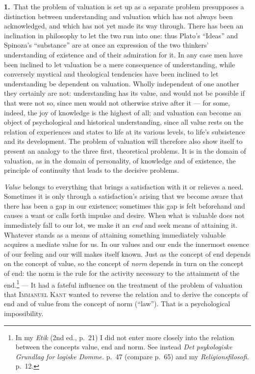 \documentclass[12pt,a4paper]{book}
\newcommand{\opage}[1]{\marginnote{\footnotesize\textit{[#1]}}}
\begin{document}
\noindent\textbf{\opage{70}1.}~That the problem of valuation is set up as a separate
problem presupposes a distinction between understanding and valuation which has
not always been acknowledged, and which has not yet made its way through. There
has been an inclination in philosophy to let the two run into one: thus Plato's
``Ideas'' and Spinoza's ``substance'' are at once an expression of the two
thinkers' understanding of existence and of their admiration for it. In any case
men have been inclined to let valuation be a mere consequence of understanding,
while conversely mystical and theological tendencies have been inclined to let
understanding be dependent on valuation. Wholly independent of one another they
certainly are not: understanding has its value, and would not be possible if that
were not so, since men would not otherwise strive after it --- for some, indeed,
the joy of knowledge is the highest of all; and valuation can become an object of
psychological and historical understanding, since all value rests on the relation
of experiences and states to life at its various levels, to life's subsistence
and its development. The problem of valuation will therefore also show itself to
present an analogy to the three first, theoretical problems. It is in the domain
of valuation, as in the domain of personality, of knowledge and of existence, the
principle of continuity that leads to the decisive problems.

\emph{Value} belongs to everything that brings a satisfaction with it or
relieves a need. Sometimes it is only through a \opage{71}satisfaction's arising that we
become aware that there has been a gap in our existence; sometimes this gap is
felt beforehand and causes a want or calls forth impulse and desire. When what is
valuable does not immediately fall to our lot, we make it an \emph{end} and seek
means of attaining it. Whatever stands as a means of attaining something
immediately valuable acquires a mediate value for us. In our values and our ends
the innermost essence of our feeling and our will makes itself known. Just as the
concept of end depends on the concept of value, so the concept of \emph{norm}
depends in turn on the concept of end: the norm is the rule for the activity
necessary to the attainment of the end.\footnote{In my \textit{Etik} (2nd ed.,
p.~21) I did not enter more closely into the relation between the concepts value,
end and norm. See instead \textit{Det psykologiske Grundlag for logiske Domme.}
p.~47 (compare p.~65) and my \textit{Religionsfilosofi.} p.~12.} --- It had a
fateful influence on the treatment of the problem of valuation that
\textsc{Immanuel Kant} wanted to reverse the relation and to derive the concepts
of end and of value from the concept of norm (``law''). That is a psychological
impossibility.
\end{document}
